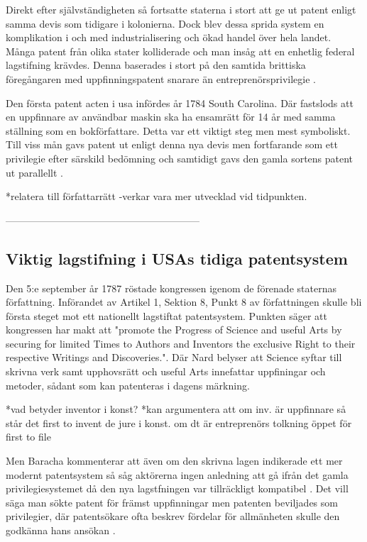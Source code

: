 Direkt efter självständigheten så fortsatte staterna i stort att ge ut patent enligt samma devis som tidigare i
kolonierna. Dock blev dessa sprida system en komplikation i och med industrialisering och ökad handel över
hela landet. Många patent från olika stater kolliderade och man insåg att en enhetlig federal
lagstifning krävdes. Denna baserades i stort på den samtida brittiska föregångaren med uppfinningspatent
snarare än entreprenörsprivilegie \cite{nard}.

Den första patent acten i usa infördes år 1784 South Carolina. Där fastslods att en uppfinnare av
användbar maskin ska ha ensamrätt för 14 år med samma ställning som en bokförfattare\cite{bracha}. Detta var ett viktigt steg men mest symboliskt. Till viss mån gavs patent ut enligt
denna nya devis men fortfarande som ett privilegie efter särskild bedömning och samtidigt gavs den gamla
sortens patent ut parallellt \cite{bracha}.

*relatera till författarrätt -verkar vara mer utvecklad vid tidpunkten.


-----------------------------------------------------------

\subsection{Viktig lagstifning i USAs tidiga patentsystem}

Den 5:e september år 1787 röstade kongressen igenom de förenade staternas författning. Införandet av Artikel 1, Sektion 8, Punkt 8 av författningen skulle bli första steget mot ett nationellt lagstiftat patentsystem. Punkten säger att kongressen har
makt att "promote the Progress of Science and useful Arts by securing for limited Times to Authors and
Inventors the exclusive Right to their respective Writings and Discoveries.". Där Nard belyser att
Science syftar till skrivna verk samt upphovsrätt och useful Arts innefattar uppfiningar och metoder,
sådant som kan patenteras i dagens märkning\cite{nard}. 

*vad betyder inventor i konst? *kan argumentera att om inv. är uppfinnare så står det first to invent de jure i konst. om dt är entreprenörs tolkning öppet för first to file

Men Baracha kommenterar att även om den skrivna lagen indikerade ett mer modernt patentsystem så såg aktörerna ingen anledning att gå ifrån det gamla privilegiesystemet då den nya lagstfningen var tillräckligt kompatibel \cite{Bracha}. Det vill säga man sökte patent för främst uppfinningar men patenten beviljades som privilegier, där patentsökare ofta beskrev fördelar för allmänheten skulle den godkänna hans ansökan \cite{bracha}.

